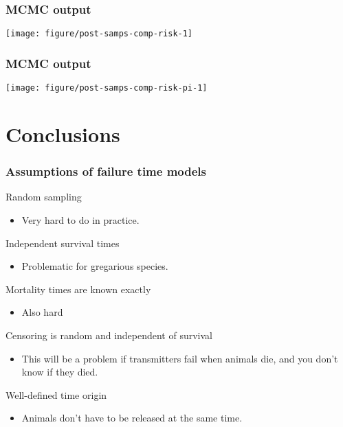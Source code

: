 \documentclass[color=usenames,dvipsnames]{beamer}\usepackage[]{graphicx}\usepackage[]{color}
\newenvironment{knitrout}{}{} %
\begin{document}
\begin{frame}[fragile]
  \frametitle{MCMC output}
\begin{knitrout}
\color{fgcolor}

{\centering \texttt{[image: figure/post-samps-comp-risk-1]} 

}


\end{knitrout}
\end{frame}




\begin{frame}[fragile]
  \frametitle{MCMC output}
\begin{knitrout}
\color{fgcolor}

{\centering \texttt{[image: figure/post-samps-comp-risk-pi-1]} 

}


\end{knitrout}
\end{frame}







\section{Conclusions}




\begin{frame}
  \frametitle{Assumptions of failure time models}
  Random sampling
  \begin{itemize}
    \item Very hard to do in practice.
  \end{itemize}
  \vfill
  Independent survival times \\
  \begin{itemize}
    \item Problematic for gregarious species. 
  \end{itemize}
  \vfill
  Mortality times are known exactly
  \begin{itemize}
    \item Also hard
  \end{itemize}
  \vfill
  Censoring is random and independent of survival
  \begin{itemize}
    \item This will be a problem if transmitters fail when animals
      die, and you don't know if they died.
  \end{itemize}
  \vfill
  Well-defined time origin
  \begin{itemize}
    \item Animals don't have to be released at the same time. 
  \end{itemize}
\end{frame}
\end{document}
